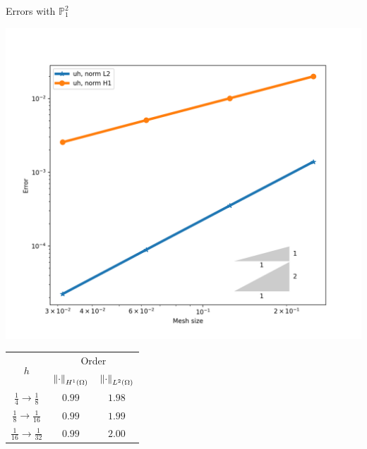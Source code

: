 \begin{frame}{Errors with $\mathbb{P}^2_1$}
	\begin{minipage}{0.50\textwidth}
		\centering
		\includegraphics[scale=0.30]{img/Difusion/errores_difusion_P1c.png}
	\end{minipage}
	\begin{minipage}{0.49\textwidth}
		\centering
		\begin{tabular}{|c|c|c|}
			\hline 
			\multirow{2}{*}{$h$} & \multicolumn{2}{c|}{Order} \\
			\cline{2-3}
			 & $\left\|\cdot\right\|_{H^1(\Omega)}$ & $\left\|\cdot\right\|_{L^2(\Omega)}$\\ 
			\hline
			\hline
			$\frac{1}{4}\to\frac{1}{8}$ & $0.99$ & $1.98$  \\ 
			\hline 
			$\frac{1}{8}\to\frac{1}{16}$ & $0.99$ & $1.99$ \\ 
			\hline 
			$\frac{1}{16}\to\frac{1}{32}$ & $0.99$ & $2.00$ \\
			\hline
		\end{tabular}
	\end{minipage}
	\end{frame}

